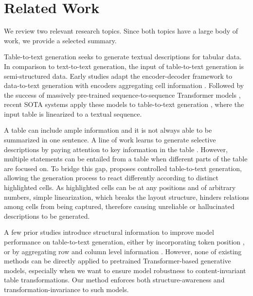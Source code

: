 \documentclass[11pt]{article}
\newcommand{\stitle}[1]{\vspace{1ex} \noindent{\bf #1.}}
\begin{document}
 \section{Related Work}

We review two relevant research topics. Since both topics have a large body of work, we provide a selected summary.

\stitle{Table-to-text Generation}
Table-to-text generation seeks to generate textual descriptions for tabular data. In comparison to text-to-text generation, the input of table-to-text generation is semi-structured data.
Early studies adapt the encoder-decoder framework to data-to-text generation with encoders aggregating cell information \citep{lebret2016neural, wiseman2017challenges, bao2018table}.
Followed by the success of massively pre-trained sequence-to-sequence Transformer models \citep{raffel2020exploring, lewis2020bart}, recent SOTA systems apply these models to table-to-text generation \citep{kale2020text, su2021plan}, where the input table is linearized to a textual sequence.

A table can include ample information and it is not always able to be summarized in one sentence.
A line of work learns to generate selective descriptions by paying attention to key information in the table \citep{perez2018bootstrapping, ma2019key}.
However, multiple statements can be entailed from a table when different parts of the table are focused on.
To bridge this gap, \citet{parikh2020totto} proposes controlled table-to-text generation, allowing the generation process to react differently according to distinct highlighted cells.
As highlighted cells can be at any positions and of arbitrary numbers, simple linearization, which breaks the layout structure, hinders relations among cells from being captured, therefore causing unreliable or hallucinated descriptions to be generated. 

A few prior studies introduce structural information to improve model performance on table-to-text generation, either by incorporating token position \citep{liu2018table}, or by aggregating row and column level information \citep{bao2018table, nema2018generating, jain2018mixed}.
However, none of existing methods can be directly applied to pretrained Transformer-based generative models, especially when we want to ensure model robustness to content-invariant table transformations.
Our method enforces both structure-awareness and transformation-invariance to such models.
\end{document}
